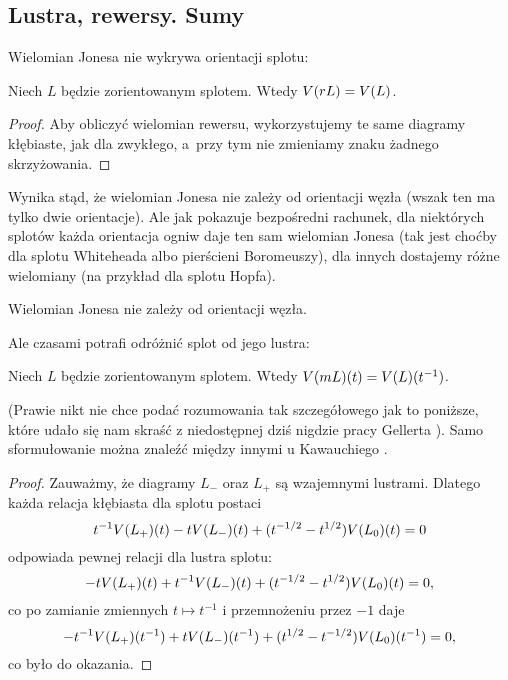 
\subsection{Lustra, rewersy. Sumy}
Wielomian Jonesa nie wykrywa orientacji splotu:

\begin{proposition}
%
    Niech $L$ będzie zorientowanym splotem.
    Wtedy $V(rL)=V(L)$.
\end{proposition}

\begin{proof}
    Aby obliczyć wielomian rewersu, wykorzystujemy te same diagramy kłębiaste,
    jak dla zwykłego, a~przy tym nie zmieniamy znaku żadnego skrzyżowania.
\end{proof}

Wynika stąd, że wielomian Jonesa nie zależy od orientacji węzła (wszak ten ma tylko dwie orientacje).
Ale jak pokazuje bezpośredni rachunek, dla niektórych splotów każda orientacja ogniw daje ten sam wielomian Jonesa (tak jest choćby dla splotu Whiteheada albo pierścieni Boromeuszy), dla innych dostajemy różne wielomiany (na przykład dla splotu Hopfa).

\begin{corollary}
    Wielomian Jonesa nie zależy od orientacji węzła.
\end{corollary}

Ale czasami potrafi odróżnić splot od jego lustra:

\begin{proposition}
%
    Niech $L$ będzie zorientowanym splotem.
    Wtedy $V(mL)(t)=V(L)(t^{-1})$.
\end{proposition}

(Prawie nikt nie chce podać rozumowania tak szczegółowego jak to poniższe, które udało się nam skraść z niedostępnej dziś nigdzie pracy Gellerta \cite[s. 12]{gellert2009}).
Samo sformułowanie można znaleźć między innymi u Kawauchiego \cite[fakt 10.4.4]{kawauchi1996}.

\begin{proof}
    Zauważmy, że diagramy $L_-$ oraz $L_+$ są wzajemnymi lustrami.
    Dlatego każda relacja kłębiasta dla splotu postaci
    \begin{equation}
        t^{-1} V(L_+)(t) - tV(L_-)(t) + (t^{-1/2} - t^{1/2}) V(L_0)(t) = 0
    \end{equation}
    odpowiada pewnej relacji dla lustra splotu:
    \begin{equation}
        -tV(L_+)(t) + t^{-1} V(L_-)(t) + (t^{-1/2} - t^{1/2}) V(L_0)(t) = 0,
    \end{equation}
    co po zamianie zmiennych $t \mapsto t^{-1}$ i przemnożeniu przez $-1$ daje
    \begin{equation}
        -t^{-1} V(L_+)(t^{-1}) + t V(L_-)(t^{-1}) + (t^{1/2} - t^{-1/2}) V(L_0)(t^{-1}) = 0,
    \end{equation}
    co było do okazania.
\end{proof}

